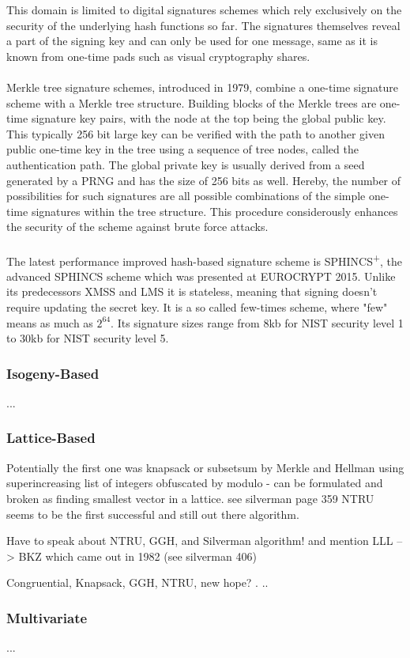 \documentclass[a4paper,11pt]{article}
\begin{document}
\begin{multicols}{2}
This domain is limited to digital signatures schemes which rely exclusively on the security of the underlying hash functions so far. The signatures themselves reveal a part of the signing key and can only be used for one message, same as it is known from one-time pads such as visual cryptography shares. \\
\\
Merkle tree signature schemes, introduced in 1979, combine a one-time signature scheme with a Merkle tree structure. Building blocks of the Merkle trees are one-time signature key pairs, with the node at the top being the global public key. This typically 256 bit large key can be verified with the path to another given public one-time key in the tree using a sequence of tree nodes, called the authentication path. The global private key is usually derived from a seed generated by a PRNG and has the size of 256 bits as well.
Hereby, the number of possibilities for such signatures are all possible combinations of the simple one-time signatures within the tree structure. This procedure considerously enhances the security of the scheme against brute force attacks. \\
\\
The latest performance improved hash-based signature scheme is SPHINCS\textsuperscript{+}, the advanced SPHINCS scheme which was presented at EUROCRYPT 2015. Unlike its predecessors XMSS and LMS it is stateless, meaning that signing doesn't require updating the secret key. It is a so called few-times scheme, where "few" means as much as $2^{64}$. Its signature sizes range from 8kb for NIST security level 1 to 30kb for NIST security level 5.\\


\subsubsection{Isogeny-Based}
...

\subsubsection{Lattice-Based}
Potentially the first one was knapsack or subsetsum by Merkle and Hellman using superincreasing list of integers obfuscated by modulo  - can be formulated and broken as finding smallest vector in a lattice. see silverman page 359
NTRU seems to be the first successful and still out there algorithm.

Have to speak about NTRU, GGH, and Silverman algorithm!  and mention LLL --> BKZ which came out in 1982 (see silverman 406)

Congruential, Knapsack, GGH, NTRU, new hope?
.
..

\subsubsection{Multivariate}
...



\end{multicols}

 
\end{document}
